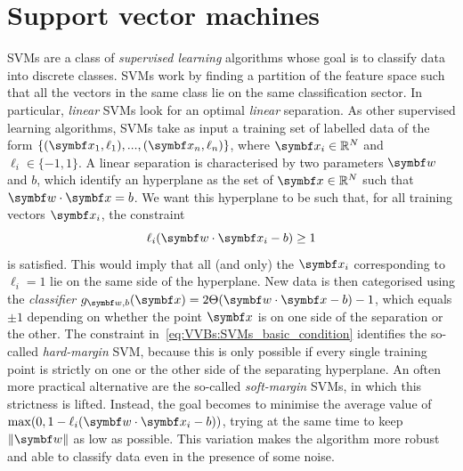 \section{Support vector machines}
\label{sec:VVBs:SVMs}


\acfp{SVM} are a class of \emph{supervised learning} algorithms whose goal is to classify data into discrete classes. \acp{SVM} work by finding a partition of the feature space such that all the vectors in the same class lie on the same classification sector.
In particular, \emph{linear} \acp{SVM} look for an optimal \emph{linear} separation.
As other supervised learning algorithms, SVMs take as input a training set of labelled data of the form $\{(\bs x_1,\ell_1),...,(\bs x_n,\ell_n)\}$, where $\bs x_i\in\RR^N$ and $\ell_i\in\{-1,1\}$.
A linear separation is characterised by two parameters $\bs w$ and $b$, which identify an hyperplane as the set of $\bs x\in\RR^N$ such that $\bs w\cdot\bs x=b$. We want this hyperplane to be such that, for all training vectors $\bs x_i$, the constraint
\begin{equation}
	\ell_i(\bs w\cdot\bs x_i-b)\ge1
	\label{eq:VVBs:SVMs_basic_condition}
\end{equation}
is satisfied. This would imply that all (and only) the $\bs x_i$ corresponding to $\ell_i=1$ lie on the same side of the hyperplane.
New data is then categorised using the \emph{classifier} $g_{\bs w,b}(\bs x)=2\Theta(\bs w\cdot\bs x-b)-1$, which equals $\pm1$ depending on whether the point $\bs x$ is on one side of the separation or the other.
The constraint in~\cref{eq:VVBs:SVMs_basic_condition} identifies the so-called \emph{hard-margin} SVM, because this is only possible if every single training point is strictly on one or the other side of the separating hyperplane.
An often more practical alternative are the so-called \emph{soft-margin} SVMs, in which this strictness is lifted. Instead, the goal becomes to minimise the average value of
$\max(0, 1- \ell_i (\bs w\cdot\bs x_i- b))$, trying at the same time to keep $\|\bs w\|$ as low as possible. This variation makes the algorithm more robust and able to classify data even in the presence of some noise.


